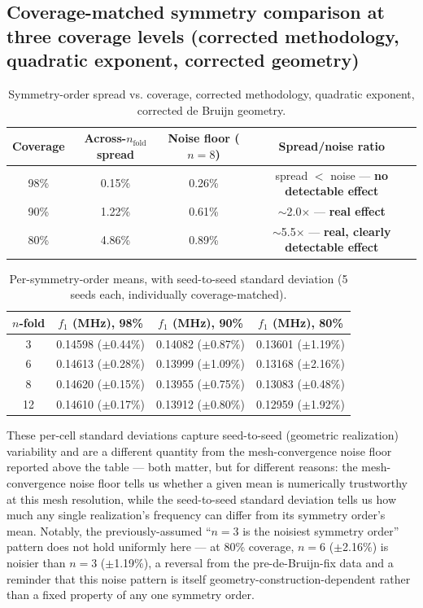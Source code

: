 \documentclass[11pt]{article}
\begin{document}
\subsection{Coverage-matched symmetry comparison at three coverage levels (corrected methodology, quadratic exponent, corrected geometry)}
\label{sec:symmetry-results}

\begin{table}[h]
\centering
\caption{Symmetry-order spread vs. coverage, corrected methodology, quadratic exponent, corrected de Bruijn geometry.}
\begin{tabular}{cccc}
\toprule
Coverage & Across-$n_{\text{fold}}$ spread & Noise floor ($n=8$) & Spread/noise ratio \\
\midrule
98\% & 0.15\% & 0.26\% & spread $<$ noise --- \textbf{no detectable effect} \\
90\% & 1.22\% & 0.61\% & $\sim$2.0$\times$ --- \textbf{real effect} \\
80\% & 4.86\% & 0.89\% & $\sim$5.5$\times$ --- \textbf{real, clearly detectable effect} \\
\bottomrule
\end{tabular}
\end{table}

\begin{table}[h]
\centering
\caption{Per-symmetry-order means, with seed-to-seed standard deviation (5 seeds each, individually coverage-matched).}
\begin{tabular}{cccc}
\toprule
$n$-fold & $f_1$ (MHz), 98\% & $f_1$ (MHz), 90\% & $f_1$ (MHz), 80\% \\
\midrule
3 & 0.14598 ($\pm$0.44\%) & 0.14082 ($\pm$0.87\%) & 0.13601 ($\pm$1.19\%) \\
6 & 0.14613 ($\pm$0.28\%) & 0.13999 ($\pm$1.09\%) & 0.13168 ($\pm$2.16\%) \\
8 & 0.14620 ($\pm$0.15\%) & 0.13955 ($\pm$0.75\%) & 0.13083 ($\pm$0.48\%) \\
12 & 0.14610 ($\pm$0.17\%) & 0.13912 ($\pm$0.80\%) & 0.12959 ($\pm$1.92\%) \\
\bottomrule
\end{tabular}
\end{table}

These per-cell standard deviations capture seed-to-seed (geometric realization) variability and are a different quantity from the mesh-convergence noise floor reported above the table --- both matter, but for different reasons: the mesh-convergence noise floor tells us whether a given mean is numerically trustworthy at this mesh resolution, while the seed-to-seed standard deviation tells us how much any single realization's frequency can differ from its symmetry order's mean. Notably, the previously-assumed ``$n=3$ is the noisiest symmetry order'' pattern does not hold uniformly here --- at 80\% coverage, $n=6$ ($\pm$2.16\%) is noisier than $n=3$ ($\pm$1.19\%), a reversal from the pre-de-Bruijn-fix data and a reminder that this noise pattern is itself geometry-construction-dependent rather than a fixed property of any one symmetry order.
\end{document}
